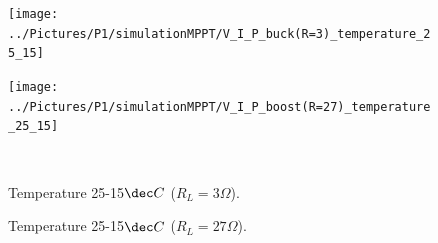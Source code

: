 \vspace{0.1cm}
\begin{figure}[H]
	\begin{minipage}[c]{0.5\textwidth}
		\centering
		\texttt{[image: ../Pictures/P1/simulationMPPT/V\_I\_P\_buck(R=3)\_temperature\_25\_15]} %
	\end{minipage}%
	\hfill
	\begin{minipage}[c]{0.5\textwidth}
		\centering
		\texttt{[image: ../Pictures/P1/simulationMPPT/V\_I\_P\_boost(R=27)\_temperature\_25\_15]} %
	\end{minipage} \\ %
	\begin{minipage}[t]{0.45\textwidth}
		\caption{Temperature 25-15$\dec C$ ($R_{L}=3\Omega$).} %
		\label{bucktemperature}
	\end{minipage}%
	\hfill
	\begin{minipage}[t]{0.45\textwidth}
		\caption{Temperature 25-15$\dec C$ ($R_{L}=27\Omega$).} %
		\label{boosttemperature}
	\end{minipage}
\end{figure}




